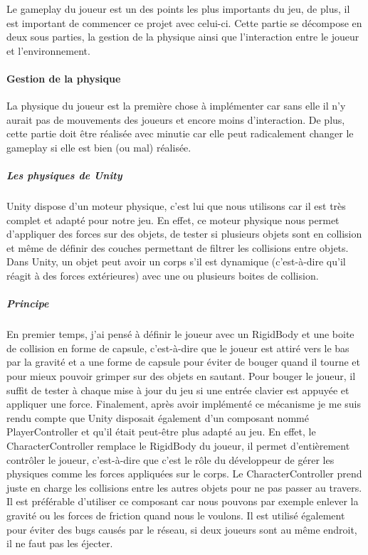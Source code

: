 \documentclass{article}
\begin{document}
Le gameplay du joueur est un des points les plus importants du jeu, de plus, il est important de commencer ce projet avec celui-ci. Cette partie se décompose en deux sous parties, la gestion de la physique ainsi que l'interaction entre le joueur et l'environnement.

\paragraph{Gestion de la physique}

La physique du joueur est la première chose à implémenter car sans elle il n'y aurait pas de mouvements des joueurs et encore moins d'interaction.
De plus, cette partie doit être réalisée avec minutie car elle peut radicalement changer le gameplay si elle est bien (ou mal) réalisée.

\subparagraph{Les physiques de Unity}

Unity dispose d'un moteur physique, c'est lui que nous utilisons car il est très complet et adapté pour notre jeu. En effet, ce moteur physique nous permet d'appliquer des forces sur des objets, de tester si plusieurs objets sont en collision et même de définir des couches permettant de filtrer les collisions entre objets. Dans Unity, un objet peut avoir un corps s'il est dynamique (c'est-à-dire qu'il réagit à des forces extérieures) avec une ou plusieurs boites de collision.

\subparagraph{Principe}

En premier temps, j'ai pensé à définir le joueur avec un RigidBody et une boite de collision en forme de capsule, c'est-à-dire que le joueur est attiré vers le bas par la gravité et a une forme de capsule pour éviter de bouger quand il tourne et pour mieux pouvoir grimper sur des objets en sautant. Pour bouger le joueur, il suffit de tester à chaque mise à jour du jeu si une entrée clavier est appuyée et appliquer une force. Finalement, après avoir implémenté ce mécanisme je me suis rendu compte que Unity disposait également d'un composant nommé PlayerController et qu'il était peut-être plus adapté au jeu. En effet, le CharacterController remplace le RigidBody du joueur, il permet d'entièrement contrôler le joueur, c'est-à-dire que c'est le rôle du développeur de gérer les physiques comme les forces appliquées sur le corps. Le CharacterController prend juste en charge les collisions entre les autres objets pour ne pas passer au travers. Il est préférable d'utiliser ce composant car nous pouvons par exemple enlever la gravité ou les forces de friction quand nous le voulons. Il est utilisé également pour éviter des bugs causés par le réseau, si deux joueurs sont au même endroit, il ne faut pas les éjecter.
\end{document}
